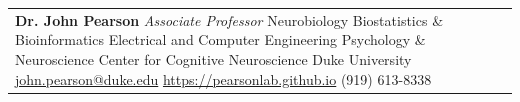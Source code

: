 \documentclass[margin]{res}
\begin{document}
\begin{resume}
\begin{tabular}{p{6cm} p{5.5cm}}
    \vspace{\baselineskip}
    \textbf{Dr. John Pearson}\newline
    \small{
      \emph{Associate Professor}\newline
      Neurobiology\newline
      Biostatistics \& Bioinformatics\newline
      Electrical and Computer Engineering\newline
      Psychology \& Neuroscience\newline
      Center for Cognitive Neuroscience\newline
      Duke University\newline
      \href{mailto:john.pearson@duke.edu}{john.pearson@duke.edu}\newline
      \url{https://pearsonlab.github.io}\newline
      (919) 613-8338
    }
  \end{tabular}
\end{resume}
\end{document}
